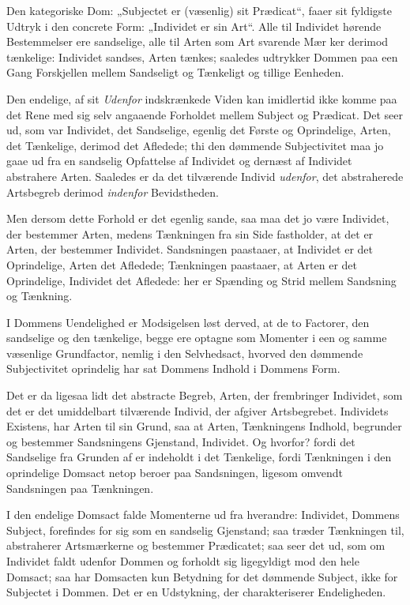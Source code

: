 \documentclass[12pt]{book}
\newcommand{\opage}[1]{\marginnote{\footnotesize\textit{[#1]}}}
\begin{document}
Den kategoriske Dom: „Subjectet er (væsenlig) sit Prædicat“, faaer
sit fyldigste Udtryk i den concrete Form: „Individet er sin Art“.
Alle til Individet hørende Bestemmelser ere sandselige, alle til
Arten som Art svarende Mær%
\opage{17}ker derimod tænkelige: Individet sandses, Arten tænkes; saaledes
udtrykker Dommen paa een Gang Forskjellen mellem Sandseligt og
Tænkeligt og tillige Eenheden.

Den endelige, af sit \emph{Udenfor} indskrænkede Viden kan imidlertid
ikke komme paa det Rene med sig selv angaaende Forholdet mellem
Subject og Prædicat. Det seer ud, som var Individet, det Sandselige,
egenlig det Første og Oprindelige, Arten, det Tænkelige, derimod det
Afledede; thi den dømmende Subjectivitet maa jo gaae ud fra en
sandselig Opfattelse af Individet og dernæst af Individet abstrahere
Arten. Saaledes er da det tilværende Individ \emph{udenfor}, det
abstraherede Artsbegreb derimod \emph{indenfor} Bevidstheden.

Men dersom dette Forhold er det egenlig sande, saa maa det jo være
Individet, der bestemmer Arten, medens Tænkningen fra sin Side
fastholder, at det er Arten, der bestemmer Individet. Sandsningen
paastaaer, at Individet er det Oprindelige, Arten det Afledede;
Tænkningen paastaaer, at Arten er det Oprindelige, Individet det
Afledede: her er Spænding og Strid mellem Sandsning og Tænkning.

I Dommens Uendelighed er Modsigelsen løst derved, at de to Factorer,
den sandselige og den tænkelige, begge ere optagne som Momenter i een
og samme væsenlige Grundfactor, nemlig i den Selvhedsact, hvorved den
dømmende Subjectivitet oprindelig har sat Dommens Indhold i Dommens
Form.

Det er da ligesaa lidt det abstracte Begreb, Arten, der frembringer
Individet, som det er det umiddelbart tilværende Individ, der afgiver
Artsbegrebet. Individets Existens, har Arten til sin Grund, saa at
Arten, Tænkningens Indhold, begrunder og bestemmer Sandsningens
Gjenstand, Individet. Og hvorfor? fordi det Sandselige fra Grunden af
er indeholdt i det Tænkelige, fordi Tænkningen i den oprindelige
Domsact netop beroer paa Sandsningen, ligesom omvendt Sandsningen paa
Tænkningen.

\opage{18} I den endelige Domsact falde Momenterne ud fra hverandre: Individet,
Dommens Subject, forefindes for sig som en sandselig Gjenstand; saa
træder Tænkningen til, abstraherer Artsmærkerne og bestemmer
Prædicatet; saa seer det ud, som om Individet faldt udenfor Dommen og
forholdt sig ligegyldigt mod den hele Domsact; saa har Domsacten kun
Betydning for det dømmende Subject, ikke for Subjectet i Dommen. Det
er en Udstykning, der charakteriserer Endeligheden.
\end{document}
